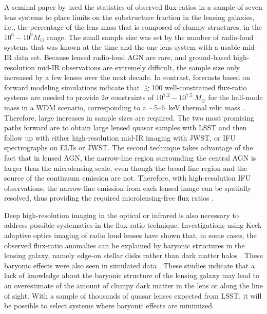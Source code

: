 \documentclass[modern,linenumbers]{aastex62}
\begin{document}
A seminal paper by \cite{Dalal:2002aa} used the statistics of observed flux-ratios in a sample of seven lens systems to place limits on the substructure fraction in the lensing galaxies, i.e., the percentage of the lens mass that is composed of clumpy structures, in the $10^6 - 10^9 M_\odot$ range.
The small sample size was set by the number of radio-loud systems that was known at the time and the one lens system with a usable mid-IR data set.  
Because lensed radio-loud AGN are rare, and ground-based high-resolution mid-IR observations are extremely difficult, the sample size only increased by a few lenses over the next decade.  
In contrast, forecasts based on forward modeling simulations indicate that $\gtrsim$100 well-constrained flux-ratio systems are needed to provide 2$\sigma$ constraints of $10^{7.2} - 10^{7.5}~M_\odot$ for the half-mode mass in a WDM scenario, corresponding to a $\sim$5--6~keV thermal relic mass \citep{Gilman++18}.
Therefore, large increases in sample sizes are required.
The two most promising paths forward are to obtain large lensed quasar samples with LSST and then follow up with either high-resolution mid-IR imaging with JWST, or IFU spectrographs on ELTs or JWST.  The second technique takes advantage of the fact that in lensed AGN, the narrow-line region surrounding the central AGN is larger than the microlensing scale, even though the broad-line region and the source of the continuum emission are not.  Therefore, with high-resolution IFU observations, the narrow-line emission from each lensed image can be spatially resolved, thus providing the required microlensing-free flux ratios \citep{MoustakasMetcalf03, Nierenberg++14, Nierenberg:2017vlg}.

Deep high-resolution imaging in the optical or infrared is also necessary to address possible systematics in the flux-ratio technique.  
Investigations using Keck adaptive optics imaging of radio loud lenses have shown that, in some cases, the observed flux-ratio anomalies can be explained by baryonic structures in the lensing galaxy, namely edge-on stellar disks rather than dark matter halos \citep{Hsueh++2016, Hsueh++2017}.
These baryonic effects were also seen in simulated data \citep{Gilman++2017, Hsueh++2018}.
These studies indicate that a lack of knowledge about the baryonic structure of the lensing galaxy may lead to an overestimate of the amount of clumpy dark matter in the lens or along the line of sight.
With a sample of thousands of quasar lenses expected from LSST, it will be possible to select systems where baryonic effects are minimized.
\end{document}
